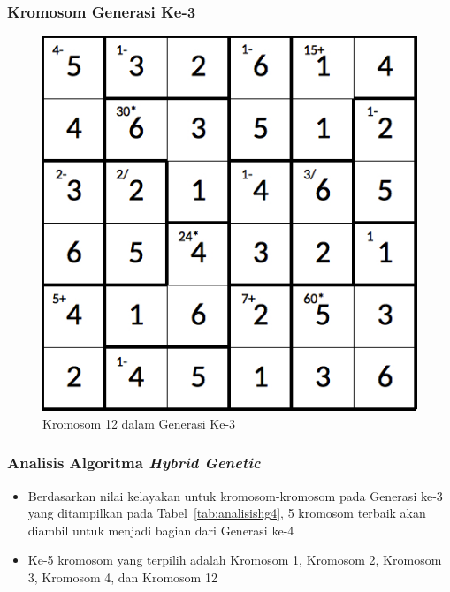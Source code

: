 \documentclass{beamer}
\begin{document}
\note{

}

\begin{frame}
\frametitle{Kromosom Generasi Ke-3}
\begin{figure}
\centering
\captionsetup{justification=centering}
\includegraphics[scale=0.333]{Gambar/hybridgenetic/Generation3Chromosome12}
\caption[Kromosom 12 dalam Generasi Ke-3]{Kromosom 12 dalam Generasi Ke-3}
\label{fig:analisisg3k12}
\end{figure}
\end{frame}

\note{

}

\begin{frame}
\frametitle{Analisis Algoritma \textit{Hybrid Genetic}}
\begin{itemize}
\item Berdasarkan nilai kelayakan untuk kromosom-kromosom pada Generasi ke-3 yang ditampilkan pada Tabel~\ref{tab:analisishg4}, 5 kromosom terbaik akan diambil untuk menjadi bagian dari Generasi ke-4
\item Ke-5 kromosom yang terpilih adalah Kromosom 1, Kromosom 2, Kromosom 3, Kromosom 4, dan Kromosom 12
\end{itemize}
\end{frame}

\end{document}

